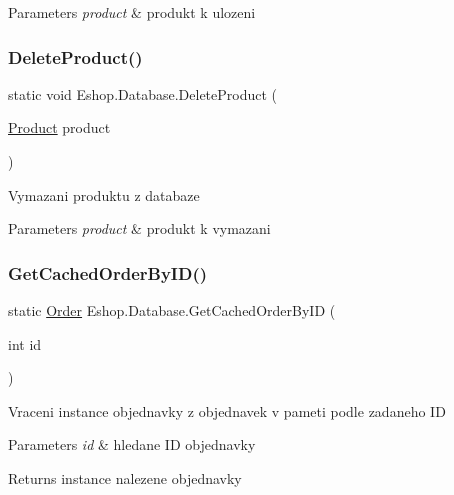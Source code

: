 \begin{DoxyParams}{Parameters}
{\em product} & produkt k ulozeni\\
\hline
\end{DoxyParams}
\mbox{\label{class_eshop_1_1_database_af1e45f95550ba58b35c2e3814696193c}} 
\subsubsection{\texorpdfstring{DeleteProduct()}{DeleteProduct()}}
{\footnotesize\ttfamily static void Eshop.\+Database.\+Delete\+Product (\begin{DoxyParamCaption}\item[{\mbox{\hyperlink{class_eshop_1_1_product}{Product}}}]{product }\end{DoxyParamCaption})\hspace{0.3cm}{\ttfamily [static]}}



Vymazani produktu z databaze 


\begin{DoxyParams}{Parameters}
{\em product} & produkt k vymazani\\
\hline
\end{DoxyParams}
\mbox{\label{class_eshop_1_1_database_a7a2971f27ae7da358f1fceca1bd712ec}} 
\subsubsection{\texorpdfstring{GetCachedOrderByID()}{GetCachedOrderByID()}}
{\footnotesize\ttfamily static \mbox{\hyperlink{class_eshop_1_1_order}{Order}} Eshop.\+Database.\+Get\+Cached\+Order\+By\+ID (\begin{DoxyParamCaption}\item[{int}]{id }\end{DoxyParamCaption})\hspace{0.3cm}{\ttfamily [static]}}



Vraceni instance objednavky z objednavek v pameti podle zadaneho ID 


\begin{DoxyParams}{Parameters}
{\em id} & hledane ID objednavky\\
\hline
\end{DoxyParams}
\begin{DoxyReturn}{Returns}
instance nalezene objednavky
\end{DoxyReturn}
\mbox{\label{class_eshop_1_1_database_a77cb0c6d892ec285991db9b705ea8ed6}} 
